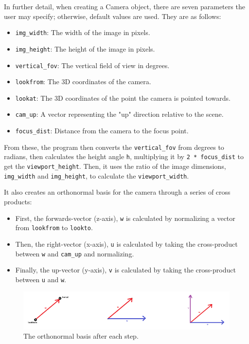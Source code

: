 \documentclass[conference]{IEEEtran}
\begin{document}
In further detail, when creating a Camera object, there are seven parameters the user may specify; otherwise, default values are used. They are as follows:
\begin{itemize}
  \item \texttt{img\_width}: The width of the image in pixels.
  \item \texttt{img\_height}: The height of the image in pixels.
  \item \texttt{vertical\_fov}: The vertical field of view in degrees.
  \item \texttt{lookfrom}: The 3D coordinates of the camera.
  \item \texttt{lookat}: The 3D coordinates of the point the camera is pointed towards.
  \item \texttt{cam\_up}: A vector representing the "up" direction relative to the scene.
  \item \texttt{focus\_dist}: Distance from the camera to the focus point.
\end{itemize}

From these, the program then converts the \texttt{vertical\_fov} from degrees to radians, then calculates the height angle \texttt{h}, multiplying it by \texttt{2 * focus\_dist} to get the \texttt{viewport\_height}.
Then, it uses the ratio of the image dimensions, \texttt{img\_width} and \texttt{img\_height}, to calculate the \texttt{viewport\_width}.

It also creates an orthonormal basis for the camera through a series of cross products: 
\begin{itemize} 
  \item First, the forwards-vector (z-axis), \texttt{w} is calculated by normalizing a vector from \texttt{lookfrom} to \texttt{lookto}.
  \item Then, the right-vector (x-axis), \texttt{u} is calculated by taking the cross-product between \texttt{w} and \texttt{cam\_up} and normalizing.
  \item Finally, the up-vector (y-axis), \texttt{v} is calculated by taking the cross-product between \texttt{u} and \texttt{w}.
\end{itemize}
\begin{figure}[htbp]
  \centerline{\includegraphics[width=\linewidth]{orthonormal-basis}}
  \caption{The orthonormal basis after each step.}
  \label{orthonormal-basis}
\end{figure}
\end{document}
